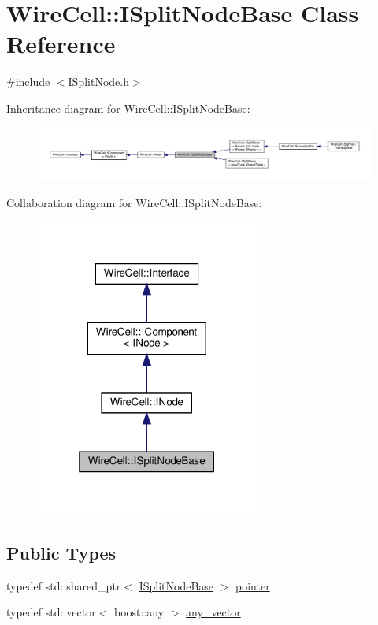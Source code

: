 \hypertarget{class_wire_cell_1_1_i_split_node_base}{}\section{Wire\+Cell\+:\+:I\+Split\+Node\+Base Class Reference}
\label{class_wire_cell_1_1_i_split_node_base}


{\ttfamily \#include $<$I\+Split\+Node.\+h$>$}



Inheritance diagram for Wire\+Cell\+:\+:I\+Split\+Node\+Base\+:
\nopagebreak
\begin{figure}[H]
\begin{center}
\leavevmode
\includegraphics[width=350pt]{class_wire_cell_1_1_i_split_node_base__inherit__graph}
\end{center}
\end{figure}


Collaboration diagram for Wire\+Cell\+:\+:I\+Split\+Node\+Base\+:
\nopagebreak
\begin{figure}[H]
\begin{center}
\leavevmode
\includegraphics[width=208pt]{class_wire_cell_1_1_i_split_node_base__coll__graph}
\end{center}
\end{figure}
\subsection*{Public Types}
\begin{DoxyCompactItemize}
\item 
typedef std\+::shared\+\_\+ptr$<$ \hyperlink{class_wire_cell_1_1_i_split_node_base}{I\+Split\+Node\+Base} $>$ \hyperlink{class_wire_cell_1_1_i_split_node_base_a41b42d93b75314ec48c9b760c9aca088}{pointer}
\item 
typedef std\+::vector$<$ boost\+::any $>$ \hyperlink{class_wire_cell_1_1_i_split_node_base_af68870ead16af4b29a3b0d486f217fe8}{any\+\_\+vector}
\end{DoxyCompactItemize}
